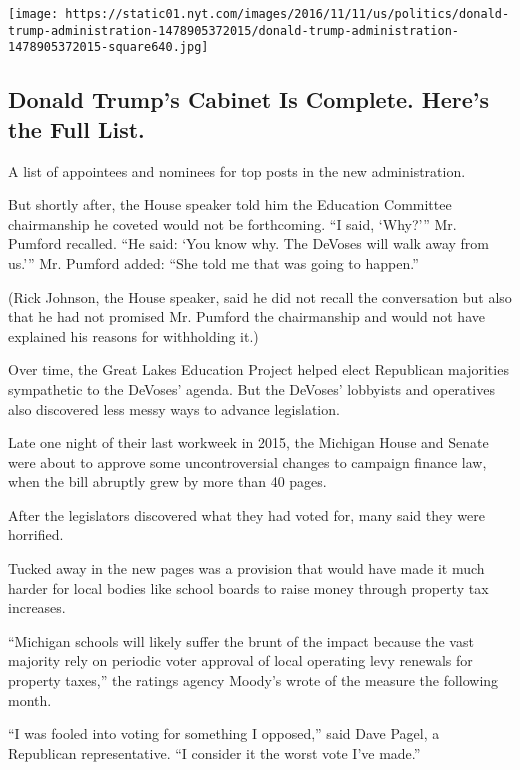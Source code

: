 \href{https://www.nytimes.com/interactive/2016/us/politics/donald-trump-administration.html}{}

\texttt{[image: https://static01.nyt.com/images/2016/11/11/us/politics/donald-trump-administration-1478905372015/donald-trump-administration-1478905372015-square640.jpg]}

\hypertarget{donald-trumps-cabinet-is-complete-heres-the-full-list}{%
\subsection{Donald Trump's Cabinet Is Complete. Here's the Full
List.}\label{donald-trumps-cabinet-is-complete-heres-the-full-list}}

A list of appointees and nominees for top posts in the new
administration.

But shortly after, the House speaker told him the Education Committee
chairmanship he coveted would not be forthcoming. ``I said, `Why?''' Mr.
Pumford recalled. ``He said: `You know why. The DeVoses will walk away
from us.''' Mr. Pumford added: ``She told me that was going to happen.''

(Rick Johnson, the House speaker, said he did not recall the
conversation but also that he had not promised Mr. Pumford the
chairmanship and would not have explained his reasons for withholding
it.)

Over time, the Great Lakes Education Project helped elect Republican
majorities sympathetic to the DeVoses' agenda. But the DeVoses'
lobbyists and operatives also discovered less messy ways to advance
legislation.

Late one night of their last workweek in 2015, the Michigan House and
Senate were about to approve some uncontroversial changes to campaign
finance law, when the bill abruptly grew by more than 40 pages.

After the legislators discovered what they had voted for, many said they
were horrified.

Tucked away in the new pages was a provision that would have made it
much harder for local bodies like school boards to raise money through
property tax increases.

``Michigan schools will likely suffer the brunt of the impact because
the vast majority rely on periodic voter approval of local operating
levy renewals for property taxes,'' the ratings agency Moody's wrote of
the measure the following month.

``I was fooled into voting for something I opposed,'' said Dave Pagel, a
Republican representative. ``I consider it the worst vote I've made.''

